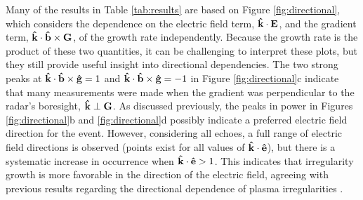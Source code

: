 Many of the results in Table \ref{tab:results} are based on Figure \ref{fig:directional}, which considers the dependence on the electric field term, \(\mathbf{\hat{k}}\cdot\mathbf{E}\), and the gradient term, \(\mathbf{\hat{k}}\cdot\mathbf{\hat{b}}\times\mathbf{G}\), of the growth rate independently.  Because the growth rate is the product of these two quantities, it can be challenging to interpret these plots, but they still provide useful insight into directional dependencies.  The two strong peaks at \(\mathbf{\hat{k}}\cdot\mathbf{\hat{b}}\times\mathbf{\hat{g}}=1\) and \(\mathbf{\hat{k}}\cdot\mathbf{\hat{b}}\times\mathbf{\hat{g}}=-1\) in Figure \ref{fig:directional}c indicate that many measurements were made when the gradient was perpendicular to the radar's boresight, \(\mathbf{\hat{k}}\perp\mathbf{G}\).  As discussed previously, the peaks in power in Figures \ref{fig:directional}b and \ref{fig:directional}d possibly indicate a preferred electric field direction for the event.  However, considering all echoes, a full range of electric field directions is observed (points exist for all values of \(\mathbf{\hat{k}}\cdot\mathbf{\hat{e}}\)), but there is a systematic increase in occurrence when \(\mathbf{\hat{k}}\cdot\mathbf{\hat{e}}>1\).  This indicates that irregularity growth is more favorable in the direction of the electric field, agreeing with previous results regarding the directional dependence of plasma irregularities \citep{Lamarche2016}.


